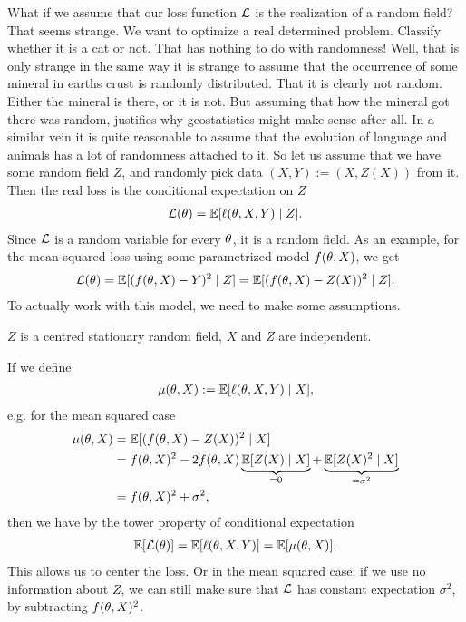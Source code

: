 What if we assume that our loss function \(\mathcal{L}\) is the
realization of a random field? That seems strange. We want to optimize a real
determined problem. Classify whether it is a cat or not. That has nothing to do
with randomness! Well, that is only strange in the same way it is strange to
assume that the occurrence of some mineral in earths crust is randomly
distributed.  That it is clearly not random. Either the mineral is there, or it
is not. But assuming that how the mineral got there was random, justifies why
geostatistics might make sense after all. In a similar vein it is quite
reasonable to assume that the evolution of language and animals has a lot of
randomness attached to it. So let us assume that we have some random field
\(Z\), and randomly pick data \((X,Y) := (X,Z(X))\) from it. Then the real loss
is the conditional expectation on \(Z\)
\begin{align*}
	\mathcal{L}(\theta) = \mathbb{E}[\ell(\theta, X,Y)\mid Z].
\end{align*}
Since \(\mathcal{L}\) is a random variable for every \(\theta\), it is a random field.
As an example, for the mean squared loss using some parametrized model
\(f(\theta, X)\), we get
\begin{align*}
	\mathcal{L}(\theta)
	= \mathbb{E}[(f(\theta, X) - Y)^2 \mid Z]
	= \mathbb{E}[(f(\theta, X) - Z(X))^2 \mid Z].
\end{align*}
To actually work with this model, we need to make some assumptions.

\begin{axiom}
	\(Z\) is a centred stationary random field, \(X\) and \(Z\) are independent.
\end{axiom}

If we define
\begin{align*}
	\mu(\theta, X):= \mathbb{E}[\ell(\theta, X,Y)\mid X],
\end{align*}
e.g. for the mean squared case
\begin{align*}
	\mu(\theta, X)&= \mathbb{E}[(f(\theta, X)-Z(X))^2 \mid X]\\
	&= f(\theta, X)^2 - 2f(\theta, X)\underbrace{\mathbb{E}[Z(X)\mid X]}_{=0}
	+ \underbrace{\mathbb{E}[Z(X)^2\mid X]}_{=\sigma^2}\\
	&= f(\theta, X)^2 + \sigma^2,
\end{align*}
then we have by the tower property of conditional expectation
\begin{align*}
	\mathbb{E}[\mathcal{L}(\theta)]
	= \mathbb{E}[\ell(\theta, X,Y)]
	= \mathbb{E}[\mu(\theta, X)].
\end{align*}
This allows us to center the loss. Or in the mean squared case: if we use no
information about \(Z\), we can still make sure that \(\mathcal{L}\) has constant
expectation \(\sigma^2\), by subtracting \(f(\theta, X)^2\).


